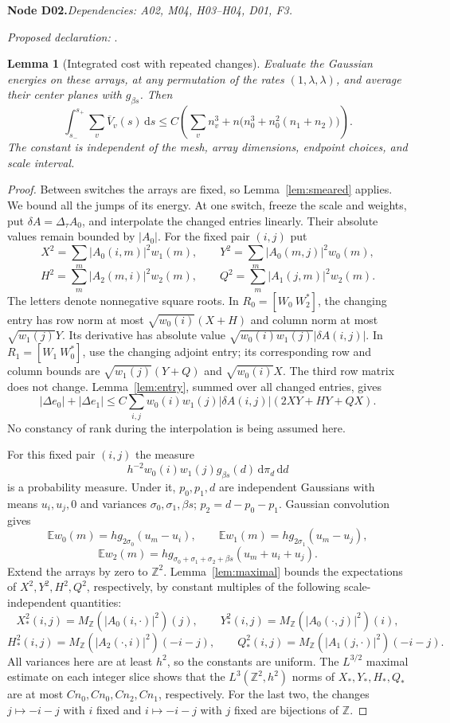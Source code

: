 \documentclass[11pt]{article}
\newtheorem{lemma}[theorem]{Lemma}
\theoremstyle{remark}\newtheorem{remark}[theorem]{Remark}
\newcommand{\Z}{\mathbb Z}\newcommand{\N}{\mathbb N}
\newcommand{\dd}{\,\mathrm d}\newcommand{\tr}{\operatorname{tr}}
\newcommand{\bpnode}[3]{\par\Needspace{5\baselineskip}\noindent\textbf{Node #1.}\quad\textit{Dependencies: #2.}\par\noindent\textit{Proposed declaration:} \texttt{\detokenize{#3}}.\par\smallskip}
\begin{document}
\bpnode{D02}{A02, M04, H03--H04, D01, F3}{repeated_mask_integrated_cost}
\begin{lemma}[Integrated cost with repeated changes]\label{lem:mask}
Evaluate the Gaussian energies on these arrays, at any permutation of the rates $(1,\lambda,\lambda)$, and average their center planes with $g_{\beta s}$. Then
\[
 \int_{s_-}^{s_+}\sum_v\overline V_v(s)\dd s
 \leq C\left(\sum_v n_v^3+n\bigl(n_0^3+n_0^2(n_1+n_2)\bigr)\right).
\]
The constant is independent of the mesh, array dimensions, endpoint choices, and scale interval.
\end{lemma}
\begin{proof}
Between switches the arrays are fixed, so Lemma~\ref{lem:smeared} applies. We bound all the jumps of its energy. At one switch, freeze the scale and weights, put $\delta A=\Delta_\tau A_0$, and interpolate the changed entries linearly. Their absolute values remain bounded by $|A_0|$. For the fixed pair $(i,j)$ put
\[
 X^2=\sum_m|A_0(i,m)|^2w_1(m),\qquad
 Y^2=\sum_m|A_0(m,j)|^2w_0(m),
\]
\[
 H^2=\sum_m|A_2(m,i)|^2w_2(m),\qquad
 Q^2=\sum_m|A_1(j,m)|^2w_2(m).
\]
The letters denote nonnegative square roots. In $R_0=[W_0\ W_2^*]$, the changing entry has row norm at most $\sqrt{w_0(i)}(X+H)$ and column norm at most $\sqrt{w_1(j)}Y$. Its derivative has absolute value $\sqrt{w_0(i)w_1(j)}|\delta A(i,j)|$. In $R_1=[W_1\ W_0^*]$, use the changing adjoint entry; its corresponding row and column bounds are $\sqrt{w_1(j)}(Y+Q)$ and $\sqrt{w_0(i)}X$. The third row matrix does not change. Lemma~\ref{lem:entry}, summed over all changed entries, gives
\[
 |\Delta e_0|+|\Delta e_1|
 \leq C\sum_{i,j}w_0(i)w_1(j)|\delta A(i,j)|(2XY+HY+QX).
\]
No constancy of rank during the interpolation is being assumed here.

For this fixed pair $(i,j)$ the measure
\[
 h^{-2}w_0(i)w_1(j)g_{\beta s}(d)\dd\pi_d\dd d
\]
is a probability measure. Under it, $p_0,p_1,d$ are independent Gaussians with means $u_i,u_j,0$ and variances $\sigma_0,\sigma_1,\beta s$; $p_2=d-p_0-p_1$. Gaussian convolution gives
\[
 \mathbb E w_0(m)=h g_{2\sigma_0}(u_m-u_i),\qquad
 \mathbb E w_1(m)=h g_{2\sigma_1}(u_m-u_j),
\]
\[
 \mathbb E w_2(m)=h g_{\sigma_0+\sigma_1+\sigma_2+\beta s}(u_m+u_i+u_j).
\]
Extend the arrays by zero to $\Z^2$. Lemma~\ref{lem:maximal} bounds the expectations of $X^2,Y^2,H^2,Q^2$, respectively, by constant multiples of the following scale-independent quantities:
\[
 X_*^2(i,j)=M_{\Z}(|A_0(i,\cdot)|^2)(j),\qquad
 Y_*^2(i,j)=M_{\Z}(|A_0(\cdot,j)|^2)(i),
\]
\[
 H_*^2(i,j)=M_{\Z}(|A_2(\cdot,i)|^2)(-i-j),\qquad
 Q_*^2(i,j)=M_{\Z}(|A_1(j,\cdot)|^2)(-i-j).
\]
All variances here are at least $h^2$, so the constants are uniform. The $L^{3/2}$ maximal estimate on each integer slice shows that the $L^3(\Z^2,h^2)$ norms of $X_*,Y_*,H_*,Q_*$ are at most $Cn_0,Cn_0,Cn_2,Cn_1$, respectively. For the last two, the changes $j\mapsto-i-j$ with $i$ fixed and $i\mapsto-i-j$ with $j$ fixed are bijections of $\Z$.


\end{proof}
\end{document}
